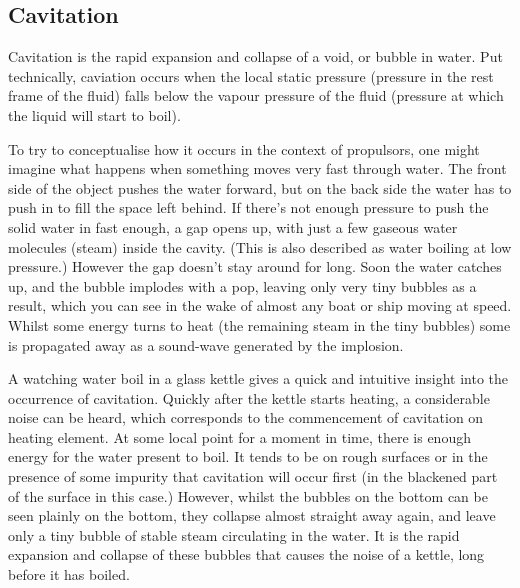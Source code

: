 \documentclass{article}\usepackage[]{graphicx}\usepackage[]{color}
\begin{document}
\subsection{Cavitation}
Cavitation is the rapid expansion and collapse of a void, or bubble in water. Put technically, caviation occurs when the local static pressure (pressure in the rest frame of the fluid) falls below the vapour pressure of the fluid (pressure at which the liquid will start to boil).

To try to conceptualise how it occurs in the context of propulsors, one might imagine what happens when something moves very fast through water.  The front side of the object pushes the water forward, but on the back side the water has to push in to fill the space left behind.  If there’s not enough pressure to push the solid water in fast enough, a gap opens up, with just a few gaseous water molecules (steam) inside the cavity.  (This is also described as water boiling at low pressure.)  However the gap doesn’t stay around for long.  Soon the water catches up, and the bubble implodes with a pop, leaving only very tiny bubbles as a result, which you can see in the wake of almost any boat or ship moving at speed.  Whilst some energy turns to heat (the remaining steam in the tiny bubbles) some is propagated away as a sound-wave generated by the implosion.

A watching water boil in a glass kettle gives a quick and intuitive insight into the occurrence of cavitation.  Quickly after the kettle starts heating, a considerable noise can be heard, which corresponds to the commencement of cavitation on heating element. At some local point for a moment in time, there is enough energy for the water present to boil.  It tends to be on rough surfaces or in the presence of some impurity that cavitation will occur first (in the blackened part of the surface in this case.)  However, whilst the bubbles on the bottom can be seen plainly on the bottom, they collapse almost straight away again, and leave only a tiny bubble of stable steam circulating in the water.  It is the rapid expansion and collapse of these bubbles that causes the noise of a kettle, long before it has boiled.
\end{document}
